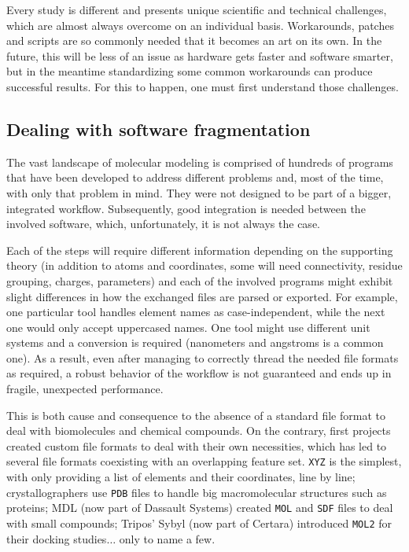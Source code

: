 Every study is different and presents unique scientific and technical challenges, which are almost always overcome on an individual basis. Workarounds, patches and scripts are so commonly needed that it becomes an art on its own. In the future, this will be less of an issue as hardware gets faster and software smarter, but in the meantime standardizing some common workarounds can produce successful results. For this to happen, one must first understand those challenges.

\subsection{Dealing with software fragmentation}

The vast landscape of molecular modeling is comprised of hundreds of programs that have been developed to address different problems and, most of the time, with only that problem in mind. They were not designed to be part of a bigger, integrated workflow. Subsequently, good integration is needed between the involved software, which, unfortunately, it is not always the case.

Each of the steps will require different information depending on the supporting theory (in addition to atoms and coordinates, some will need connectivity, residue grouping, charges, parameters) and each of the involved programs might exhibit slight differences in how the exchanged files are parsed or exported. For example, one particular tool handles element names as case-independent, while the next one would only accept uppercased names. One tool might use different unit systems and a conversion is required (nanometers and angstroms is a common one). As a result, even after managing to correctly thread the needed file formats as required, a robust behavior of the workflow is not guaranteed and ends up in fragile, unexpected performance.

This is both cause and consequence to the absence of a standard file format to deal with biomolecules and chemical compounds. On the contrary, first projects created custom file formats to deal with their own necessities, which has led to several file formats coexisting with an overlapping feature set. \texttt{XYZ} is the simplest, with only providing a list of elements and their coordinates, line by line; crystallographers use \texttt{PDB} files to handle big macromolecular structures such as proteins; MDL (now part of Dassault Systems) created \texttt{MOL} and \texttt{SDF} files to deal with small compounds; Tripos’ Sybyl (now part of Certara) introduced \texttt{MOL2} for their docking studies$ \ldots $  only to name a few.

